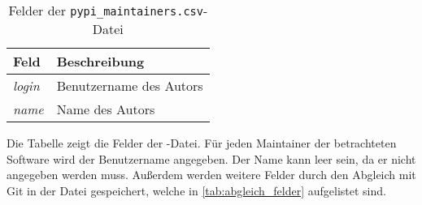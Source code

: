 \begin{table}
    \begin{tabularx}{\textwidth}{XL{10.2cm}}
        \toprule
        \textbf{Feld} & \textbf{Beschreibung}   \\ \midrule
        \emph{login}  & Benutzername des Autors \\
        \emph{name}   & Name des Autors         \\
        \bottomrule
    \end{tabularx}
    \caption{Felder der \texttt{pypi\_maintainers.csv}-Datei}
    \label{tab:pypi_maintainers}
    \small
    Die Tabelle zeigt die Felder der -Datei. Für jeden Maintainer der betrachteten Software wird der Benutzername angegeben. Der Name kann leer sein, da er nicht angegeben werden muss. Außerdem werden weitere Felder durch den Abgleich mit Git in der Datei gespeichert, welche in \autoref{tab:abgleich_felder} aufgelistet sind.
\end{table}
